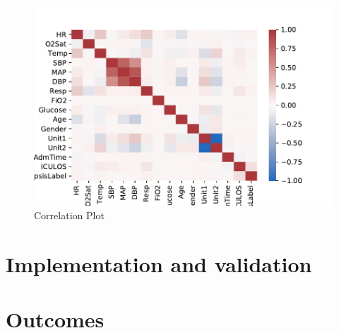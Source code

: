 \documentclass[10pt,letterpaper]{article}
\begin{document}
\begin{figure}[htpb!]
    \centering
    \includegraphics[scale = 0.7]{corr_plot.pdf}
    \caption{Correlation Plot}
    \label{fig:corr_plot}
\end{figure}

\section*{Implementation and validation}



\section*{Outcomes}

\end{document}
